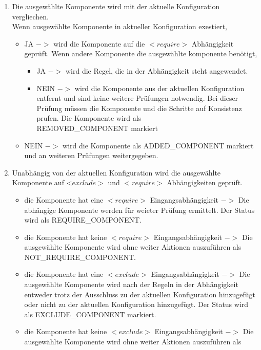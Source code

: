 \documentclass{article}
\begin{document}
\begin{enumerate}
  \item Die ausgew\"ahlte Komponente wird mit der aktuelle Konfiguration
  vergliechen. \\
  Wenn ausgew\"ahlte Komponente in aktueller Konfiguration exestiert,
  \begin{itemize}
    \item JA $->$ wird die Komponente auf die $<require>$ Abh\"angigkeit
    gepr\"uft.
    Wenn andere Komponente die ausgew\"ahlte komponente ben\"otigt,
    \begin{itemize}
      \item JA $->$ wird die Regel, die in der Abh\"angigkeit steht angewendet.
      \item NEIN $->$ wird die Komponente aus der aktuellen Konfiguration
      entfernt und sind keine weitere Pr\"ufungen notwendig. Bei dieser
      Pr\"ufung m\"ussen die Komponente und die Schritte auf Konsistenz
      prufen. Die Komponente wird als \\REMOVED\_COMPONENT markiert
    \end{itemize}
    \item NEIN $->$ wird die Komponente als ADDED\_COMPONENT markiert und
    an weiteren Pr\"ufungen weitergegeben.
  \end{itemize}
  \item Unabh\"angig von der aktuellen Konfiguration wird die ausgew\"ahlte
  Komponente auf <$exclude>$ und $<require>$ Abh\"angigkeiten gepr\"uft.
  \begin{itemize}
    \item die Komponente hat eine $<require>$ Eingangsabh\"angigkeit $->$ Die
    abh\"angige Komponente werden für weieter Prüfung ermittelt. Der Status wird
    als REQUIRE\_COMPONENT.
    \item die Komponente hat keine $<require>$ Eingangsabh\"angigkeit $->$ Die
    ausgew\"ahlte Komponente wird ohne weiter Aktionen auszuf\"uhren als
    NOT\_REQUIRE\_COMPONENT.
    \item die Komponente hat eine $<exclude>$ Eingangsabh\"angigkeit $->$ Die
    ausgew\"ahlte Komponente wird nach der Regeln in der Abh\"angigkeit
    entweder trotz der Ausschluss zu der aktuellen Konfiguration hinzugef\"ugt
    oder nicht zu der aktuellen Konfiguration hinzugef\"ugt. Der Status wird
    als EXCLUDE\_COMPONENT markiert.
    \item die Komponente hat keine $<exclude>$ Eingangsabh\"angigkeit $->$ Die
    ausgew\"ahlte Komponente wird ohne weiter Aktionen auszuf\"uhren als

\end{itemize}
\end{enumerate}
\end{document}
